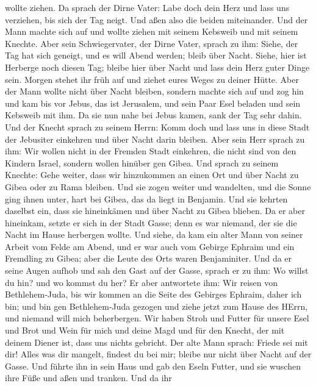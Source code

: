 wollte ziehen. Da sprach der Dirne Vater: Labe doch dein Herz und lass
uns verziehen, bis sich der Tag neigt. Und aßen also die beiden
miteinander.  Und der Mann machte sich auf und wollte ziehen
mit seinem Kebsweib und mit seinem Knechte. Aber sein Schwiegervater,
der Dirne Vater, sprach zu ihm: Siehe, der Tag hat sich geneigt, und es
will Abend werden; bleib über Nacht. Siehe, hier ist Herberge noch
diesen Tag; bleibe hier über Nacht und lass dein Herz guter Dinge sein.
Morgen stehet ihr früh auf und ziehet eures Weges zu deiner Hütte.
 Aber der Mann wollte nicht über Nacht bleiben, sondern
machte sich auf und zog hin und kam bis vor Jebus, das ist Jerusalem,
und sein Paar Esel beladen und sein Kebsweib mit ihm.  Da
sie nun nahe bei Jebus kamen, sank der Tag sehr dahin. Und der Knecht
sprach zu seinem Herrn: Komm doch und lass uns in diese Stadt der
Jebusiter einkehren und über Nacht darin bleiben.  Aber
sein Herr sprach zu ihm: Wir wollen nicht in der Fremden Stadt
einkehren, die nicht sind von den Kindern Israel, sondern wollen hinüber
gen Gibea.  Und sprach zu seinem Knechte: Gehe weiter, dass
wir hinzukommen an einen Ort und über Nacht zu Gibea oder zu Rama
bleiben.  Und sie zogen weiter und wandelten, und die Sonne
ging ihnen unter, hart bei Gibea, das da liegt in Benjamin.
 Und sie kehrten daselbst ein, dass sie hineinkämen und
über Nacht zu Gibea blieben. Da er aber hineinkam, setzte er sich in der
Stadt Gasse; denn es war niemand, der sie die Nacht im Hause herbergen
wollte.  Und siehe, da kam ein alter Mann von seiner Arbeit
vom Felde am Abend, und er war auch vom Gebirge Ephraim und ein
Fremdling zu Gibea; aber die Leute des Orts waren Benjaminiter.
 Und da er seine Augen aufhob und sah den Gast auf der
Gasse, sprach er zu ihm: Wo willst du hin? und wo kommst du her?
 Er aber antwortete ihm: Wir reisen von Bethlehem-Juda, bis
wir kommen an die Seite des Gebirges Ephraim, daher ich bin; und bin gen
Bethlehem-Juda gezogen und ziehe jetzt zum Hause des HErrn, und niemand
will mich beherbergen.  Wir haben Stroh und Futter für
unsere Esel und Brot und Wein für mich und deine Magd und für den
Knecht, der mit deinem Diener ist, dass uns nichts gebricht.
 Der alte Mann sprach: Friede sei mit dir! Alles was dir
mangelt, findest du bei mir; bleibe nur nicht über Nacht auf der Gasse.
 Und führte ihn in sein Haus und gab den Eseln Futter, und
sie wuschen ihre Füße und aßen und tranken.  Und da ihr
